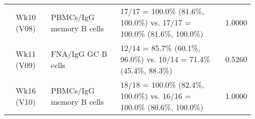 \documentclass[
]{article}
\begin{document}
\begin{table}[!h]
\begin{tabular}[t]{lllll}
\cmidrule{2-5}
\hspace{1em} & Wk10 (V08) & PBMCs/IgG memory B cells & 17/17 = 100.0\% (81.6\%, 100.0\%) vs. 17/17 = 100.0\% (81.6\%, 100.0\%) & 1.0000\\
\cmidrule{2-5}
\hspace{1em} & Wk11 (V09) & FNA/IgG GC B cells & 12/14 = 85.7\% (60.1\%, 96.0\%) vs. 10/14 = 71.4\% (45.4\%, 88.3\%) & 0.5260\\
\cmidrule{2-5}
\hspace{1em} & Wk16 (V10) & PBMCs/IgG memory B cells & 18/18 = 100.0\% (82.4\%, 100.0\%) vs. 16/16 = 100.0\% (80.6\%, 100.0\%) & 1.0000\\
\bottomrule
\end{tabular}
\end{table}
\end{document}
